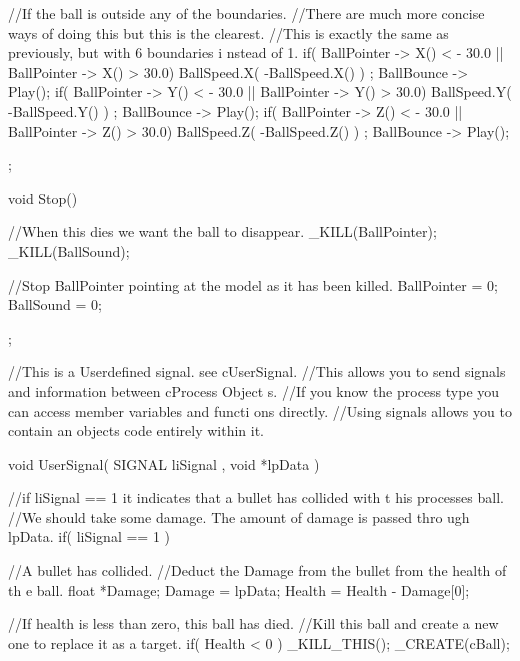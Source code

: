 \begin{DoxyCode}
{{                //If the ball is outside any of the boundaries.
                //There are much more concise ways of doing this but this is the 
      clearest.
                //This is exactly the same as previously, but with 6 boundaries i
      nstead of 1.
                if( BallPointer -> X()  < - 30.0  || BallPointer -> X() > 30.0)
                {
                        BallSpeed.X( -BallSpeed.X() ) ;
                        BallBounce -> Play();
                }
                if( BallPointer -> Y()  < - 30.0  || BallPointer -> Y() > 30.0)
                {
                        BallSpeed.Y( -BallSpeed.Y() ) ;
                        BallBounce -> Play();
                }
                if( BallPointer -> Z()  < - 30.0  || BallPointer -> Z() > 30.0)
                {
                        BallSpeed.Z( -BallSpeed.Z() ) ;
                        BallBounce -> Play();
                }

        };

        void Stop()
        {
                //When this dies we want the ball to disappear.
                        _KILL(BallPointer);
                        _KILL(BallSound);

                //Stop BallPointer pointing at the model as it has been killed.
                        BallPointer = 0;
                        BallSound = 0;
        };

        //This is a Userdefined signal. see cUserSignal.
        //This allows you to send signals and information between cProcess Object
      s.
        //If you know the process type you can access member variables and functi
      ons directly.
        //Using signals allows you to contain an objects code entirely within it.
      
        void UserSignal( SIGNAL liSignal , void *lpData )
        {
                //if liSignal == 1 it indicates that a bullet has collided with t
      his processes ball.
                //We should take some damage. The amount of damage is passed thro
      ugh lpData.
                if( liSignal == 1 )
                {
                        //A bullet has collided.
                        //Deduct the Damage from the bullet from the health of th
      e ball.
                        float *Damage;
                        Damage = lpData;
                        Health = Health - Damage[0];

                        //If health is less than zero, this ball has died.
                        //Kill this ball and create a new one to replace it as a 
      target.
                        if( Health < 0 ) { _KILL_THIS(); _CREATE(cBall); }
                }

}}
\end{DoxyCode}
